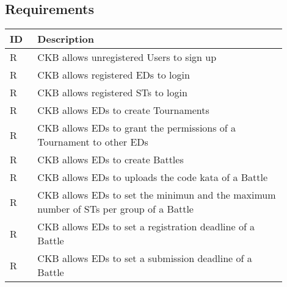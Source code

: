\subsection{Requirements}
\label{subsec:requirements3}%
\setcounter{req}{1}
\newcommand{\creq}{\thereq\stepcounter{req}}
\begin{center}
    \begin{longtable}{|l|p{0.9\linewidth}|}
        \hline
        \textbf{ID} & \textbf{Description}                                                                                                                             \\
        \hline
        R\creq      & CKB allows unregistered Users to sign up                                                                    \\
        \hline
        R\creq      & CKB allows registered EDs to login                                                                    \\
        \hline
        R\creq      & CKB allows registered STs to login                                                                    \\
        \hline
        R\creq      & CKB allows EDs to create Tournaments                                                                    \\
        \hline
        R\creq      & CKB allows EDs to grant the permissions of a Tournament to other EDs                                                                 \\
        \hline
        R\creq      & CKB allows EDs to create Battles                                                                    \\
        \hline
        R\creq      & CKB allows EDs to uploads the code kata of a Battle                                                                   \\
        \hline
        R\creq      & CKB allows EDs to set the minimun and the maximum number of STs per group of a Battle                                                                    \\
        \hline
        R\creq      & CKB allows EDs to set a registration deadline of a Battle                                                                 \\
        \hline
        R\creq      & CKB allows EDs to set a submission deadline of a Battle                                                                \\

\end{longtable}
\end{center}
